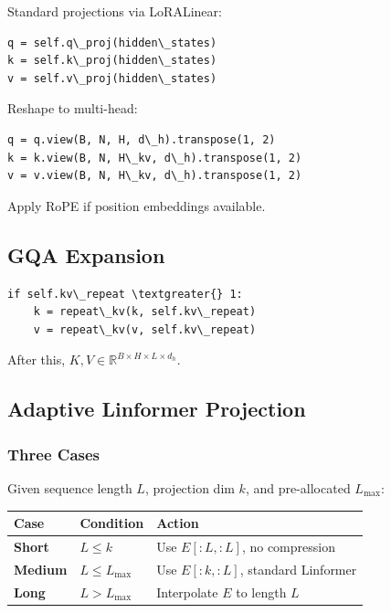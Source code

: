 Standard projections via LoRALinear:

\begin{lstlisting}
q = self.q\_proj(hidden\_states)
k = self.k\_proj(hidden\_states)
v = self.v\_proj(hidden\_states)
\end{lstlisting}

Reshape to multi-head:

\begin{lstlisting}
q = q.view(B, N, H, d\_h).transpose(1, 2)
k = k.view(B, N, H\_kv, d\_h).transpose(1, 2)
v = v.view(B, N, H\_kv, d\_h).transpose(1, 2)
\end{lstlisting}

Apply RoPE if position embeddings available.

\subsection{GQA Expansion}

\begin{lstlisting}
if self.kv\_repeat \textgreater{} 1:
    k = repeat\_kv(k, self.kv\_repeat)
    v = repeat\_kv(v, self.kv\_repeat)
\end{lstlisting}

After this, $K, V \in \mathbb{R}^{B \times H \times L \times d_h}$.

\subsection{Adaptive Linformer Projection}

\subsubsection{Three Cases}

Given sequence length $L$, projection dim $k$, and pre-allocated $L_\text{max}$:

\begin{table}[H]
\centering
\small
\begin{tabular}{lll}
\toprule
\textbf{Case} & \textbf{Condition} & \textbf{Action} \\
\midrule
\textbf{Short} & $L \leq k$ & Use $E[:L, :L]$, no compression \\
\textbf{Medium} & $L \leq L_\text{max}$ & Use $E[:k, :L]$, standard Linformer \\
\textbf{Long} & $L > L_\text{max}$ & Interpolate $E$ to length $L$ \\
\bottomrule
\end{tabular}
\end{table}

